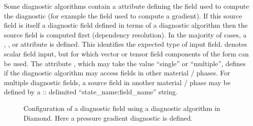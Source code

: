 Some diagnostic algorithms contain a 
attribute defining the field used to compute the diagnostic (for example the
field used to compute a gradient). If this source field is itself a diagnostic
field defined in terms of a diagnostic algorithm then the source field is
computed first (dependency resolution).
In the majority of cases, a , , 
or  attribute is defined. This identifies the
expected type of input field.  denotes scalar field
input, but for which vector or tensor field components of the form 
can be used.
The attribute , which may take the
value ``single'' or ``multiple'', defines if the diagnostic algorithm may
access fields in other material / phases. For multiple 
diagnostic fields, a source field in another material / phase
may be defined by a :: delimited ``state\_name\::field\_name'' string.

\begin{figure}[ht]
  \centering
  \caption{Configuration of a diagnostic field using a diagnostic algorithm in
           Diamond. Here a pressure gradient diagnostic is defined.}
  \label{fig:diagnostic_algorithm}
\end{figure}

